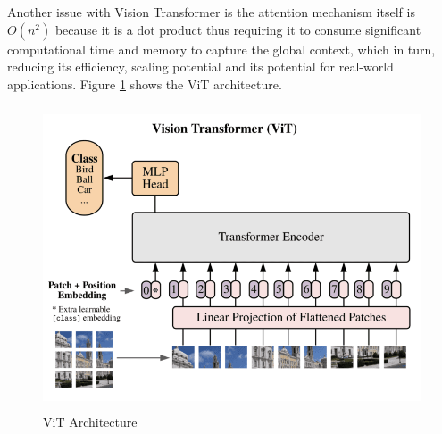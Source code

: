 Another issue with Vision Transformer is the attention mechanism itself is $O(n^2)$ because it is a dot product thus requiring it to consume significant computational time and memory to capture the global context, which in turn, reducing its efficiency, scaling potential and its potential for real-world applications. Figure \ref{fig:vit} shows the ViT architecture.

\begin{figure}[ht]
\includegraphics[width=13.5cm, height=9cm]{images/vision transformer.png}
\centering
\caption{ViT Architecture \protect\cite{16x16}}
\label{fig:vit}
\end{figure}

